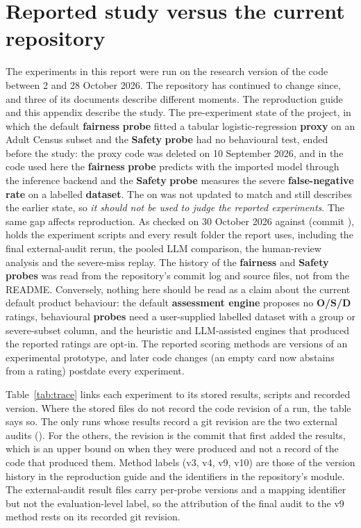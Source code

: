 \section{Reported study versus the current repository}\label{app:trace}
The experiments in this report were run on the research version of the code between 2 and 28 October 2026. The repository has continued to change since, and three of its documents describe different moments. The reproduction guide and this appendix describe the study. The pre-experiment state of the project, in which the default \textbf{fairness} \textbf{probe} fitted a tabular logistic-regression \textbf{proxy} on an Adult Census subset and the \textbf{Safety} \textbf{probe} had no behavioural test, ended before the study: the proxy code was deleted on 10 September 2026, and in the code used here the \textbf{fairness} \textbf{probe} predicts with the imported model through the inference backend and the \textbf{Safety} \textbf{probe} measures the severe \textbf{false-negative rate} on a labelled \textbf{dataset}. The  on  was not updated to match and still describes the earlier state, so \emph{it should not be used to judge the reported experiments}. The same gap affects reproduction. As checked on 30 October 2026 against  (commit ),  holds the experiment scripts and every result folder the report uses, including the final external-audit rerun, the pooled LLM comparison, the human-review analysis and the severe-miss replay. The history of the \textbf{fairness} and \textbf{Safety} \textbf{probes} was read from the repository's commit log and source files, not from the README. Conversely, nothing here should be read as a claim about the current default product behaviour: the default \textbf{assessment engine} proposes no \textbf{O/S/D} ratings, behavioural \textbf{probes} need a user-supplied labelled dataset with a group or severe-subset column, and the heuristic and LLM-assisted engines that produced the reported ratings are opt-in. The reported scoring methods are versions of an experimental prototype, and later code changes (an empty card now abstains from a rating) postdate every experiment.

Table~\ref{tab:trace} links each experiment to its stored results, scripts and recorded version. Where the stored files do not record the code revision of a run, the table says so. The only runs whose results record a git revision are the two external audits (). For the others, the revision is the commit that first added the results, which is an upper bound on when they were produced and not a record of the code that produced them. Method labels (v3, v4, v9, v10) are those of the version history in the reproduction guide and the identifiers in the repository's  module. The external-audit result files carry per-probe versions and a mapping identifier but not the evaluation-level label, so the attribution of the final audit to the v9 method rests on its recorded git revision.

